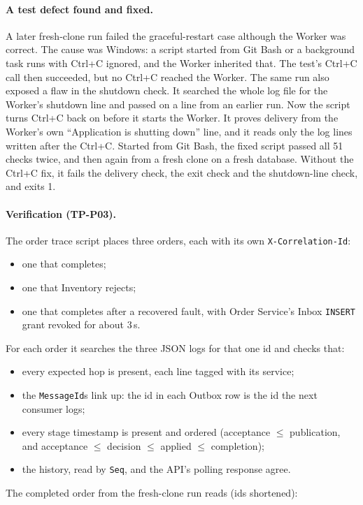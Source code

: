 \documentclass[a4paper]{report}
\begin{document}
\paragraph{A test defect found and fixed.} A later fresh-clone run failed the
graceful-restart case although the Worker was correct. The cause was
Windows: a script started from Git Bash or a background task runs with
Ctrl+C ignored, and the Worker inherited that. The test's Ctrl+C call then
succeeded, but no Ctrl+C reached the Worker. The same run also exposed a flaw
in the shutdown check. It searched the whole log file for the Worker's
shutdown line and passed on a line from an earlier run. Now the script turns
Ctrl+C back
on before it starts the Worker. It proves delivery from the Worker's own
``Application is shutting down'' line, and it reads only the log lines
written after the Ctrl+C. Started from Git Bash, the fixed script passed all
51 checks twice, and then again from a fresh clone on a fresh database.
Without the Ctrl+C fix, it fails the delivery check, the exit check and the
shutdown-line check, and exits 1.

\paragraph{Verification (TP-P03).} The order trace script places
three orders, each with its own \texttt{X-Correlation-Id}:
\begin{itemize}
  \item one that completes;
  \item one that Inventory rejects;
  \item one that completes after a recovered fault, with Order Service's
    Inbox \texttt{INSERT} grant revoked for about 3\,s.
\end{itemize}
For each order it searches the three JSON logs for that one id and checks
that:
\begin{itemize}
  \item every expected hop is present, each line tagged with its service;
  \item the \texttt{MessageId}s link up: the id in each Outbox row is the id
    the next consumer logs;
  \item every stage timestamp is present and ordered (acceptance $\le$
    publication, and acceptance $\le$ decision $\le$ applied $\le$
    completion);
  \item the history, read by \texttt{Seq}, and the API's polling response
    agree.
\end{itemize}
The completed order from the fresh-clone run reads (ids shortened):
\end{document}
